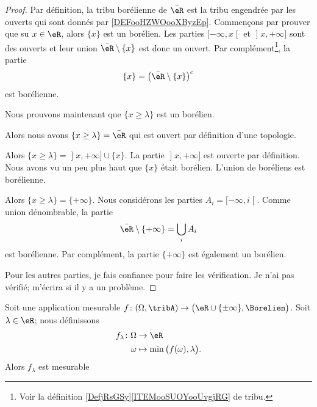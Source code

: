 \begin{proof}
	Par définition, la tribu borélienne de \( \bar \eR\) est la tribu engendrée par les ouverts qui sont donnés par \ref{DEFooHZWOooXByzEp}. Commençons par prouver que su \( x\in \eR\), alors \( \{ x \}\) est un borélien. Les parties \( \mathopen[ -\infty,x\mathclose[\) et \( \mathopen] x,+\infty\mathclose]\) sont des ouverts et leur union \( \bar \eR\setminus \{ x \}\) est donc un ouvert. Par complément\footnote{Voir la définition \ref{DefjRsGSy}\ref{ITEMooSUOYooUvgjRG} de tribu.}, la partie
	\begin{equation}
		\{ x \}=\big( \bar \eR\setminus \{ x \} \big)^c
	\end{equation}
	est borélienne.

	Nous prouvons maintenant que \( \{ x\geq \lambda \}\) est un borélien.
	\begin{subproof}
		\spitem[Si \( \lambda=-\infty\)]
		Alors nous avons \( \{ x\geq \lambda \}=\bar \eR\) qui est ouvert par définition d'une topologie.

		\spitem[Si \( \lambda\in \eR\)]
		Alors \( \{ x\geq \lambda \}=\mathopen] x,+\infty\mathclose]\cup \{ x \}\). La partie \( \mathopen] x,+\infty\mathclose]\) est ouverte par définition. Nous avons vu un peu plus haut que \( \{ x \}\) était borélien. L'union de boréliens est borélienne.

		\spitem[Si \( \lambda= +î\)]
		Alors \( \{ x\geq \lambda \}=\{ +\infty \}\). Nous considérons les parties \( A_i=\mathopen[ -\infty,i\mathclose[\). Comme union dénombrable, la partie
		\begin{equation}
			\bar \eR\setminus\{ +\infty \}=\bigcup_iA_i
		\end{equation}
		est borélienne. Par complément, la partie \( \{ +\infty \}\) est également un borélien.
	\end{subproof}
	Pour les autres parties, je fais confiance  pour faire les vérification. Je n'ai pas vérifié;  m'écrira si il y a un problème.
\end{proof}

\begin{lemma}       \label{LEMooAITEooMjHxvh}
	Soit une application mesurable \( f\colon (\Omega,\tribA)\to \big( \eR\cup\{ \pm\infty \},\Borelien \big)\). Soit \( \lambda\in \eR\); nous définissons
	\begin{equation}
		\begin{aligned}
			f_{\lambda}\colon \Omega & \to \eR                                    \\
			\omega                   & \mapsto \min\big( f(\omega),\lambda \big).
		\end{aligned}
	\end{equation}
	Alors \( f_{\lambda}\) est mesurable
\end{lemma}

